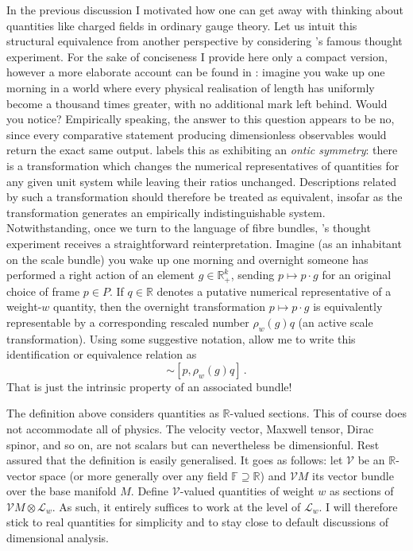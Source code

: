 \documentclass[12pt]{article}
\numberwithin{equation}{section}
\newcommand{\R}{\mathbb{R}}
\newtheorem{definition}[theorem]{Definition}
\begin{document}
In the previous discussion I motivated how one can get away with thinking about quantities like charged fields in ordinary gauge theory. Let us intuit this structural equivalence from another perspective by considering \citeauthor{Poincare1906}'s famous thought experiment. For the sake of conciseness I provide here only a compact version, however a more elaborate account can be found in \cite{Poincare1906} \citep[see also][]{Jalloh2025}: imagine you wake up one morning in a world where every physical realisation of length has uniformly become a thousand times greater, with no additional mark left behind. Would you notice? Empirically speaking, the answer to this question appears to be no, since every comparative statement producing dimensionless observables would return the exact same output. \citet{Jalloh2025} labels this as exhibiting an \emph{ontic symmetry}: there is a transformation which changes the numerical representatives of quantities for any given unit system while leaving their ratios unchanged. Descriptions related by such a transformation should therefore be treated as equivalent, insofar as the transformation generates an empirically indistinguishable system. Notwithstanding, once we turn to the language of fibre bundles, \citeauthor{Poincare1906}'s thought experiment receives a straightforward reinterpretation. Imagine (as an inhabitant on the scale bundle) you wake up one morning and overnight someone has performed a right action of an element $g\in \mathbb{R}_+^k$, sending $p\mapsto p\cdot g$ for an original choice of frame $p\in P$. If $q\in \mathbb{R}$ denotes a putative numerical representative of a weight-$w$ quantity, then the overnight transformation $p\mapsto p\cdot g$ is equivalently representable by a corresponding rescaled number $\rho_w(g)q$ (an active scale transformation). Using some suggestive notation, allow me to write this identification or equivalence relation as
\begin{equation}
    [p\cdot g,q]\sim [p,\rho_w(g)q]\,.
\end{equation}
That is just the intrinsic property of an associated bundle!
The definition above considers quantities as $\mathbb{R}$-valued sections. This of course does not accommodate all of physics. The velocity vector, Maxwell tensor, Dirac spinor, and so on, are not scalars but can nevertheless be dimensionful. Rest assured that the definition is easily generalised. It goes as follows: let $\mathcal{V}$ be an $\R$-vector space (or more generally over any field $\mathbb{F}\supseteq\R$) and $\mathcal{V}M$ its vector bundle over the base manifold $M$. Define $\mathcal{V}$-valued quantities of weight $w$ as sections of $\mathcal{V}M\otimes \mathcal{L}_w$. As such, it entirely suffices to work at the level of $\mathcal{L}_w$. I will therefore stick to real quantities for simplicity and to stay close to default discussions of dimensional analysis. 
\end{document}
